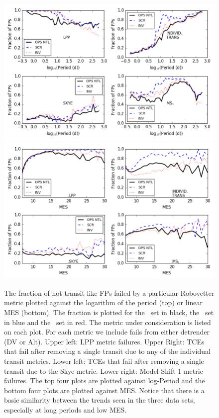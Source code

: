 
\begin{figure}[ht]
    \centering
    \includegraphics[width=0.9\linewidth]{fig-fractionFailsByMetric.png}
    \includegraphics[width=0.9\linewidth]{fig-fractionFailsByMetricMes.png}
    \caption{The fraction of not-transit-like FPs failed by a particular Robovetter metric plotted against the logarithm of the period (top) or linear MES (bottom).  The fraction is plotted for the \opstce\ set in black, the \scrtce\ set in blue and the \invtce\ set in red. The metric under consideration is listed on each plot.  For each metric we include fails from either detrender (DV or Alt). Upper left: LPP metric failures. Upper Right: TCEs that fail after removing a single transit due to any of the individual transit metrics.  Lower left: TCEs that fail after removing a single transit due to the Skye metric. Lower right: Model Shift 1 metric failures. The top four plots are plotted against log-Period and the bottom four plots are plotted against MES. Notice that there is a basic similarity between the trends seen in the three data sets, especially at long periods and low MES.}
    \label{f:fractionFailMetric}
\end{figure}

